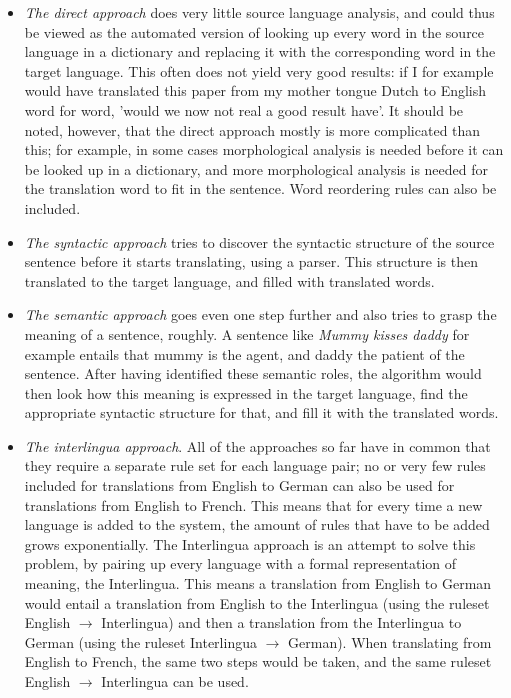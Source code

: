 \documentclass[12pt]{article}
\begin{document}
\begin{itemize}
\item \emph{The direct approach} does very little source language analysis, and could thus be viewed as the automated version of looking up every word in the source language in a dictionary and replacing it with the corresponding word in the target language. This often does not yield very good results: if I for example would have translated this paper from my mother tongue Dutch to English word for word, 'would we now not real a good result have'. It should be noted, however, that the direct approach mostly is more complicated than this; for example, in some cases morphological analysis is needed before it can be looked up in a dictionary, and more morphological analysis is needed for the translation word to fit in the sentence. Word reordering rules can also be included.
\item \emph{The syntactic approach} tries to discover the syntactic structure of the source sentence before it starts translating, using a parser. This structure is then translated to the target language, and filled with translated words.
\item \emph{The semantic approach} goes even one step further and also tries to grasp the meaning of a sentence, roughly. A sentence like \emph{Mummy kisses daddy} for example entails that mummy is the agent, and daddy the patient of the sentence. After having identified these semantic roles, the algorithm would then look how this meaning is expressed in the target language, find the appropriate syntactic structure for that, and fill it with the translated words.
\item \emph{The interlingua approach}. All of the approaches so far have in common that they require a separate rule set for each language pair; no or very few rules included for translations from English to German can also be used for translations from English to French. This means that for every time a new language is added to the system, the amount of rules that have to be added grows exponentially. The Interlingua approach is an attempt to solve this problem, by pairing up every language with a formal representation of meaning, the Interlingua. This means a translation from English to German would entail a translation from English to the Interlingua (using the ruleset English $\rightarrow$ Interlingua) and then a translation from the Interlingua to German (using the ruleset Interlingua $\rightarrow$ German). When translating from English to French, the same two steps would be taken, and the same ruleset English $\rightarrow$ Interlingua can be used.
\end{itemize}
\end{document}
